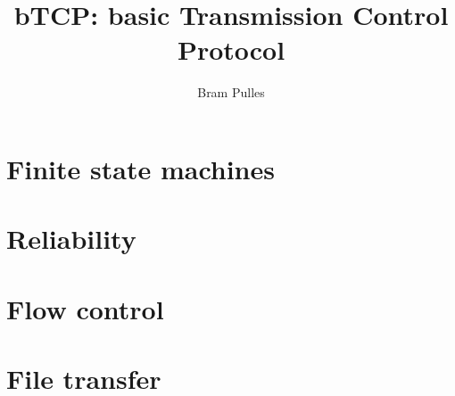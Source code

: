 \documentclass[a4paper]{article}
\author{Bram Pulles}
\title{\textbf{bTCP: basic Transmission Control Protocol}}
\begin{document}
\maketitle

\tableofcontents
\pagebreak

\section{Finite state machines}

\section{Reliability}

\section{Flow control}

\section{File transfer}
\end{document}
